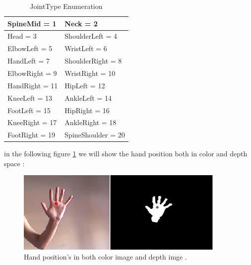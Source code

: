 \begin{table}[h!]
\centering

\begin{tabu} to 0.6\textwidth { | X[l] | X[r] | }

 \hline
 SpineMid = 1  & Neck = 2    \\
 \hline 
 Head = 3  &  ShoulderLeft = 4    \\
\hline
  ElbowLeft = 5   &  WristLeft = 6    \\
\hline

 HandLeft =	7  &   ShoulderRight = 8    \\
\hline
 
ElbowRight = 9  &  WristRight = 10   \\
\hline
 
 HandRight = 11  &  HipLeft = 12   \\
\hline
 
 KneeLeft = 13  &  AnkleLeft = 14   \\
\hline
 
FootLeft = 15  &  HipRight = 16   \\
\hline
 
 KneeRight = 17  & AnkleRight = 18     \\
\hline

FootRight = 19   & SpineShoulder = 20     \\

\hline

 \end{tabu}
\caption{JointType Enumeration}
 \label{table:t1} 

 \end{table}

in the following figure \ref{fig:cam9} we will show the hand position both in color and depth space :

\begin{figure}[H]
\centering
\includegraphics[width=0.9\textwidth]{img/colorvsdpeth.png}
\caption[colorvsdepth]{Hand position's in both color image and depth imge .\label{fig:cam9}}

\end{figure}

